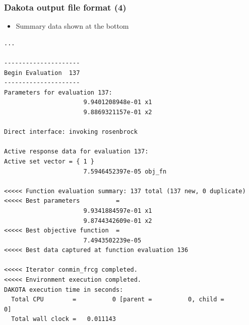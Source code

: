 \documentclass[t]{beamer}
\begin{document}
\begin{frame}[fragile]
  \frametitle{Dakota output file format (4)}
  \begin{itemize}
    \item Summary data shown at the bottom
  \end{itemize}
  \begin{tiny}\begin{lstlisting}
...

---------------------
Begin Evaluation  137
---------------------
Parameters for evaluation 137:
                      9.9401208948e-01 x1
                      9.8869321157e-01 x2

Direct interface: invoking rosenbrock

Active response data for evaluation 137:
Active set vector = { 1 }
                      7.5946452397e-05 obj_fn

<<<<< Function evaluation summary: 137 total (137 new, 0 duplicate)
<<<<< Best parameters          =
                      9.9341884597e-01 x1
                      9.8744342609e-01 x2
<<<<< Best objective function  =
                      7.4943502239e-05
<<<<< Best data captured at function evaluation 136

<<<<< Iterator conmin_frcg completed.
<<<<< Environment execution completed.
DAKOTA execution time in seconds:
  Total CPU        =          0 [parent =          0, child =          0]
  Total wall clock =   0.011143\end{lstlisting}\end{tiny}
\end{frame}

\end{document}
